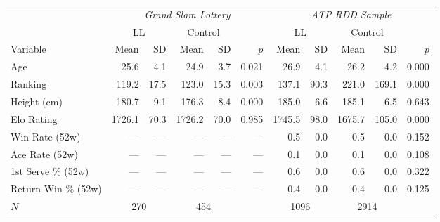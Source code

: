 \begin{tabular}{l rr rr rr rr rr}
\toprule
 & \multicolumn{5}{c}{\textit{Grand Slam Lottery}} & \multicolumn{5}{c}{\textit{ATP RDD Sample}} \\
\cmidrule(lr){2-6} \cmidrule(lr){7-11}
 & \multicolumn{2}{c}{LL} & \multicolumn{2}{c}{Control} & & \multicolumn{2}{c}{LL} & \multicolumn{2}{c}{Control} & \\
\cmidrule(lr){2-3} \cmidrule(lr){4-5} \cmidrule(lr){7-8} \cmidrule(lr){9-10}
Variable & Mean & SD & Mean & SD & $p$ & Mean & SD & Mean & SD & $p$ \\
\midrule
Age & 25.6 & 4.1 & 24.9 & 3.7 & 0.021 & 26.9 & 4.1 & 26.2 & 4.2 & 0.000 \\
Ranking & 119.2 & 17.5 & 123.0 & 15.3 & 0.003 & 137.1 & 90.3 & 221.0 & 169.1 & 0.000 \\
Height (cm) & 180.7 & 9.1 & 176.3 & 8.4 & 0.000 & 185.0 & 6.6 & 185.1 & 6.5 & 0.643 \\
Elo Rating & 1726.1 & 70.3 & 1726.2 & 70.0 & 0.985 & 1745.5 & 98.0 & 1675.7 & 105.0 & 0.000 \\
Win Rate (52w) & --- & --- & --- & --- & --- & 0.5 & 0.0 & 0.5 & 0.0 & 0.152 \\
Ace Rate (52w) & --- & --- & --- & --- & --- & 0.1 & 0.0 & 0.1 & 0.0 & 0.108 \\
1st Serve \% (52w) & --- & --- & --- & --- & --- & 0.6 & 0.0 & 0.6 & 0.0 & 0.322 \\
Return Win \% (52w) & --- & --- & --- & --- & --- & 0.4 & 0.0 & 0.4 & 0.0 & 0.125 \\
\midrule
$N$ & \multicolumn{2}{c}{270} & \multicolumn{2}{c}{454} & & \multicolumn{2}{c}{1096} & \multicolumn{2}{c}{2914} & \\
\bottomrule
\end{tabular}
